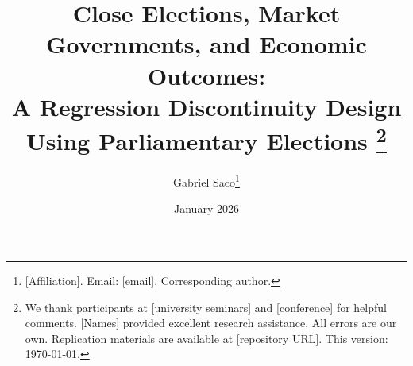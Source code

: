 \documentclass[12pt,a4paper]{article}
\begin{document}

\title{%
    Close Elections, Market Governments, and Economic Outcomes:\\
    A Regression Discontinuity Design Using Parliamentary Elections%
    \thanks{We thank participants at [university seminars] and [conference] for 
    helpful comments. [Names] provided excellent research assistance. 
    All errors are our own. Replication materials are available at [repository URL].
    This version: \today.}
}

\author{%
    Gabriel Saco\thanks{[Affiliation]. Email: [email]. Corresponding author.}
}

\date{January 2026}

\maketitle

\end{document}
